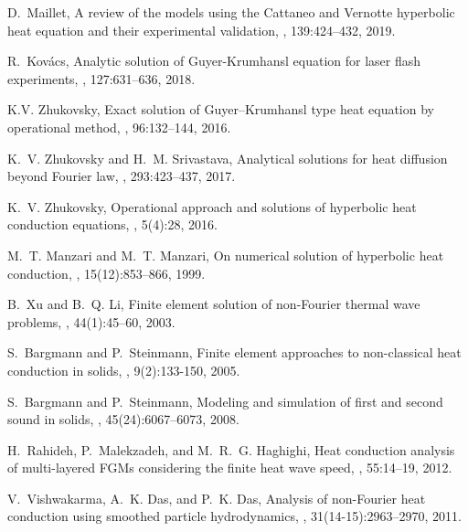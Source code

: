 \documentclass[sn-mathphys]{sn-jnl}%
\theoremstyle{thmstyleone}%
\theoremstyle{thmstyletwo}%
\theoremstyle{thmstylethree}%
\begin{document}
\begin{thebibliography}{9}
	D.~Maillet,
	\newblock A review of the models using the {C}attaneo and {V}ernotte hyperbolic
	heat equation and their experimental validation,
	, 139:424--432, 2019.
	
	R.~Kov\'acs,
	\newblock Analytic solution of {G}uyer-{K}rumhansl equation for laser flash
	experiments,
	, 127:631--636,
	2018.
	
	K.V. Zhukovsky,
	\newblock Exact solution of {G}uyer--{K}rumhansl type heat equation by
	operational method,
	, 96:132--144,
	2016.
	
	K.~V. Zhukovsky and H.~M. Srivastava,
	\newblock Analytical solutions for heat diffusion beyond {F}ourier law,
	, 293:423--437, 2017.
	
	K.~V. Zhukovsky,
	\newblock Operational approach and solutions of hyperbolic heat conduction
	equations,
	, 5(4):28, 2016.
	
	M.~T. Manzari and M.~T. Manzari,
	\newblock On numerical solution of hyperbolic heat conduction,
	,
	15(12):853--866, 1999.
	
	B.~Xu and B.~Q. Li,
	\newblock Finite element solution of non-{F}ourier thermal wave problems,
	, 44(1):45--60,
	2003.
	
	S.~Bargmann and P.~Steinmann,
	\newblock Finite element approaches to non-classical heat conduction in solids,
	, 9(2):133-150,
	2005.
	
	S.~Bargmann and P.~Steinmann,
	\newblock Modeling and simulation of first and second sound in solids,
	,
	45(24):6067--6073, 2008.
	
	H.~Rahideh, P.~Malekzadeh, and M.~R.~G. Haghighi,
	\newblock Heat conduction analysis of multi-layered {FGM}s considering the
	finite heat wave speed,
	, 55:14--19, 2012.
	
	V.~Vishwakarma, A.~K. Das, and P.~K. Das,
	\newblock Analysis of non-{F}ourier heat conduction using smoothed particle
	hydrodynamics,
	, 31(14-15):2963--2970, 2011.
	

\end{thebibliography}
\end{document}
